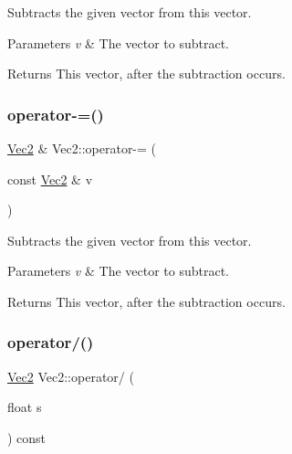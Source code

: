 Subtracts the given vector from this vector.


\begin{DoxyParams}{Parameters}
{\em v} & The vector to subtract. \\
\hline
\end{DoxyParams}
\begin{DoxyReturn}{Returns}
This vector, after the subtraction occurs. 
\end{DoxyReturn}
\mbox{\label{classVec2_a8be0266d41d4ee2f550a4e36e6f4b364}} 
\subsubsection{\texorpdfstring{operator-\/=()}{operator-=()}\hspace{0.1cm}{\footnotesize\ttfamily [2/2]}}
{\footnotesize\ttfamily \hyperlink{classVec2}{Vec2} \& Vec2\+::operator-\/= (\begin{DoxyParamCaption}\item[{const \hyperlink{classVec2}{Vec2} \&}]{v }\end{DoxyParamCaption})\hspace{0.3cm}{\ttfamily [inline]}}

Subtracts the given vector from this vector.


\begin{DoxyParams}{Parameters}
{\em v} & The vector to subtract. \\
\hline
\end{DoxyParams}
\begin{DoxyReturn}{Returns}
This vector, after the subtraction occurs. 
\end{DoxyReturn}
\mbox{\label{classVec2_a30794ad88645e3d0279e8253e4355e8d}} 
\subsubsection{\texorpdfstring{operator/()}{operator/()}\hspace{0.1cm}{\footnotesize\ttfamily [1/2]}}
{\footnotesize\ttfamily \hyperlink{classVec2}{Vec2} Vec2\+::operator/ (\begin{DoxyParamCaption}\item[{float}]{s }\end{DoxyParamCaption}) const\hspace{0.3cm}{\ttfamily [inline]}}

